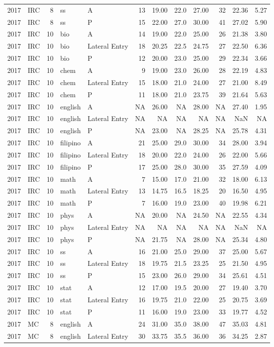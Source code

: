\documentclass[]{article}
\begin{document}
\begin{longtable}[]{@{}rlrllrrrrrrr@{}}
2017 & IRC & 8 & ss & A & 13 & 19.00 & 22.0 & 27.00 & 32 & 22.36 &
5.27\tabularnewline
2017 & IRC & 8 & ss & P & 15 & 22.00 & 27.0 & 30.00 & 41 & 27.02 &
5.90\tabularnewline
2017 & IRC & 10 & bio & A & 14 & 19.00 & 22.0 & 25.00 & 26 & 21.38 &
3.80\tabularnewline
2017 & IRC & 10 & bio & Lateral Entry & 18 & 20.25 & 22.5 & 24.75 & 27 &
22.50 & 6.36\tabularnewline
2017 & IRC & 10 & bio & P & 12 & 20.00 & 23.0 & 25.00 & 29 & 22.34 &
3.66\tabularnewline
2017 & IRC & 10 & chem & A & 9 & 19.00 & 23.0 & 26.00 & 28 & 22.19 &
4.83\tabularnewline
2017 & IRC & 10 & chem & Lateral Entry & 15 & 18.00 & 21.0 & 24.00 & 27
& 21.00 & 8.49\tabularnewline
2017 & IRC & 10 & chem & P & 11 & 18.00 & 21.0 & 23.75 & 39 & 21.64 &
5.63\tabularnewline
2017 & IRC & 10 & english & A & NA & 26.00 & NA & 28.00 & NA & 27.40 &
1.95\tabularnewline
2017 & IRC & 10 & english & Lateral Entry & NA & NA & NA & NA & NA & NaN
& NA\tabularnewline
2017 & IRC & 10 & english & P & NA & 23.00 & NA & 28.25 & NA & 25.78 &
4.31\tabularnewline
2017 & IRC & 10 & filipino & A & 21 & 25.00 & 29.0 & 30.00 & 34 & 28.00
& 3.94\tabularnewline
2017 & IRC & 10 & filipino & Lateral Entry & 18 & 20.00 & 22.0 & 24.00 &
26 & 22.00 & 5.66\tabularnewline
2017 & IRC & 10 & filipino & P & 17 & 25.00 & 28.0 & 30.00 & 35 & 27.59
& 4.09\tabularnewline
2017 & IRC & 10 & math & A & 7 & 15.00 & 17.0 & 21.00 & 32 & 18.00 &
6.13\tabularnewline
2017 & IRC & 10 & math & Lateral Entry & 13 & 14.75 & 16.5 & 18.25 & 20
& 16.50 & 4.95\tabularnewline
2017 & IRC & 10 & math & P & 7 & 16.00 & 19.0 & 23.00 & 40 & 19.98 &
6.21\tabularnewline
2017 & IRC & 10 & phys & A & NA & 20.00 & NA & 24.50 & NA & 22.55 &
4.34\tabularnewline
2017 & IRC & 10 & phys & Lateral Entry & NA & NA & NA & NA & NA & NaN &
NA\tabularnewline
2017 & IRC & 10 & phys & P & NA & 21.75 & NA & 28.00 & NA & 25.34 &
4.80\tabularnewline
2017 & IRC & 10 & ss & A & 16 & 21.00 & 25.0 & 29.00 & 37 & 25.00 &
5.67\tabularnewline
2017 & IRC & 10 & ss & Lateral Entry & 18 & 19.75 & 21.5 & 23.25 & 25 &
21.50 & 4.95\tabularnewline
2017 & IRC & 10 & ss & P & 15 & 23.00 & 26.0 & 29.00 & 34 & 25.61 &
4.51\tabularnewline
2017 & IRC & 10 & stat & A & 12 & 17.00 & 19.5 & 20.00 & 27 & 19.40 &
3.70\tabularnewline
2017 & IRC & 10 & stat & Lateral Entry & 16 & 19.75 & 21.0 & 22.00 & 25
& 20.75 & 3.69\tabularnewline
2017 & IRC & 10 & stat & P & 11 & 16.00 & 19.0 & 23.00 & 33 & 19.77 &
4.52\tabularnewline
2017 & MC & 8 & english & A & 24 & 31.00 & 35.0 & 38.00 & 47 & 35.03 &
4.81\tabularnewline
2017 & MC & 8 & english & Lateral Entry & 30 & 33.75 & 35.5 & 36.00 & 36
& 34.25 & 2.87\tabularnewline

\end{longtable}
\end{document}
